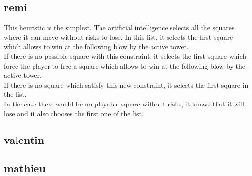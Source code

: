 \documentclass[a4paper, 11pt]{article}
\begin{document}
\subsection{remi}
This heuristic is the simplest. The artificial intelligence selects all the squares where it can move without risks to lose. In this list, it selects the first square which allows to win at the following blow by the active tower.\\
If there is no possible square with this constraint, it selects the first square which force the player to free a square which allows to win at the following blow by the active tower.\\
If there is no square which satisfy this new constraint, it selects the first square in the list.\\
In the case there would be no playable square without risks, it knows that it will lose and it also chooses the first one of the list.

\subsection{valentin}


\subsection{mathieu}
\end{document}
